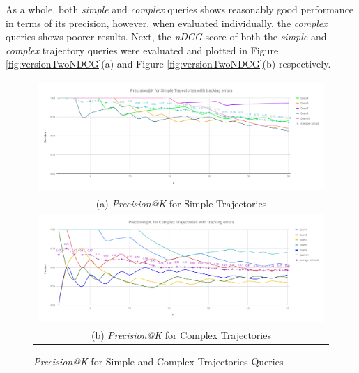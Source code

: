 As a whole, both \textit{simple} and \textit{complex} queries shows reasonably good performance in terms of its precision, however, when evaluated individually, the \textit{complex} queries shows poorer results. Next, the \textit{nDCG} score of both the \textit{simple} and \textit{complex} trajectory queries were evaluated and plotted in Figure \ref{fig:versionTwoNDCG}(a) and Figure \ref{fig:versionTwoNDCG}(b) respectively.


\begin{figure}[htb!]
  \centering
\begin{tabular}{c}
 \includegraphics[width=0.9\linewidth]{image/retrievalTwo/p@k_simple.png}\\
 (a) \textit{Precision@K} for Simple Trajectories \\
 \includegraphics[width=0.9\linewidth]{image/retrievalTwo/p@k_complex.png} \\
 (b) \textit{Precision@K} for Complex Trajectories
\end{tabular}
\caption{\textit{Precision@K} for Simple and Complex Trajectories Queries} \label{fig:versionTwoPatKAll}
\end{figure}


